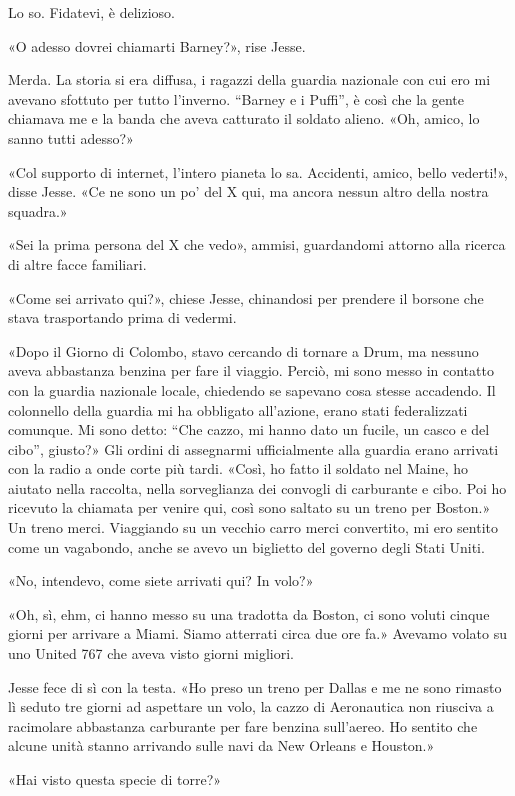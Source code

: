 Lo so. Fidatevi, è delizioso.

«O adesso dovrei chiamarti Barney?», rise Jesse.

Merda. La storia si era diffusa, i ragazzi della guardia nazionale con
cui ero mi avevano sfottuto per tutto l'inverno. ``Barney e i Puffi'', è
così che la gente chiamava me e la banda che aveva catturato il soldato
alieno. «Oh, amico, lo sanno tutti adesso?»

«Col supporto di internet, l'intero pianeta lo sa. Accidenti, amico,
bello vederti!», disse Jesse. «Ce ne sono un po' del X qui, ma ancora
nessun altro della nostra squadra.»

«Sei la prima persona del X che vedo», ammisi, guardandomi attorno alla
ricerca di altre facce familiari.

«Come sei arrivato qui?», chiese Jesse, chinandosi per prendere il
borsone che stava trasportando prima di vedermi.

«Dopo il Giorno di Colombo, stavo cercando di tornare a Drum, ma nessuno
aveva abbastanza benzina per fare il viaggio. Perciò, mi sono messo in
contatto con la guardia nazionale locale, chiedendo se sapevano cosa
stesse accadendo. Il colonnello della guardia mi ha obbligato
all'azione, erano stati federalizzati comunque. Mi sono detto: ``Che
cazzo, mi hanno dato un fucile, un casco e del cibo'', giusto?» Gli
ordini di assegnarmi ufficialmente alla guardia erano arrivati con la
radio a onde corte più tardi. «Così, ho fatto il soldato nel Maine, ho
aiutato nella raccolta, nella sorveglianza dei convogli di carburante e
cibo. Poi ho ricevuto la chiamata per venire qui, così sono saltato su
un treno per Boston.» Un treno merci. Viaggiando su un vecchio carro
merci convertito, mi ero sentito come un vagabondo, anche se avevo un
biglietto del governo degli Stati Uniti.

«No, intendevo, come siete arrivati qui? In volo?»

«Oh, sì, ehm, ci hanno messo su una tradotta da Boston, ci sono voluti
cinque giorni per arrivare a Miami. Siamo atterrati circa due ore fa.»
Avevamo volato su uno United 767 che aveva visto giorni migliori.

Jesse fece di sì con la testa. «Ho preso un treno per Dallas e me ne
sono rimasto lì seduto tre giorni ad aspettare un volo, la cazzo di
Aeronautica non riusciva a racimolare abbastanza carburante per fare
benzina sull'aereo. Ho sentito che alcune unità stanno arrivando sulle
navi da New Orleans e Houston.»

«Hai visto questa specie di torre?»

